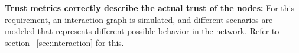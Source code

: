 %

\textbf{Trust metrics correctly describe the actual trust of the nodes:} For
this requirement, an interaction graph is simulated, and different scenarios
are modeled that represents different possible behavior in the network.  Refer
to section ~\ref{sec:interaction} for this.

